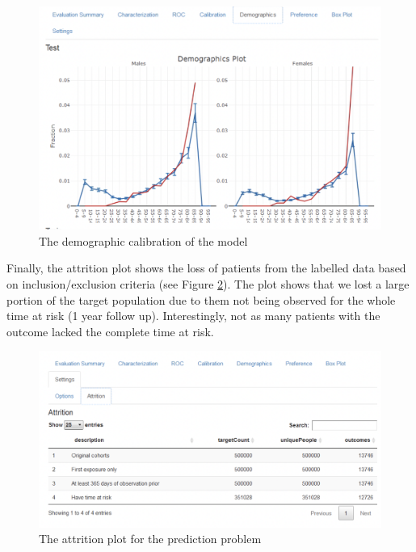 \documentclass[11pt]{book}
\theoremstyle{definition}
\theoremstyle{definition}
\theoremstyle{definition}
\theoremstyle{remark}
\begin{document}
\begin{figure}

{\centering \includegraphics[width=1\linewidth]{images/PatientLevelPrediction/shiny/singleShiny/singleShinyDemo} 

}

\caption{The demographic calibration of the model}\label{fig:shinyDemo}
\end{figure}

Finally, the attrition plot shows the loss of patients from the labelled
data based on inclusion/exclusion criteria (see Figure
\ref{fig:shinyAtt}). The plot shows that we lost a large portion of the
target population due to them not being observed for the whole time at
risk (1 year follow up). Interestingly, not as many patients with the
outcome lacked the complete time at risk.

\begin{figure}

{\centering \includegraphics[width=1\linewidth]{images/PatientLevelPrediction/shiny/singleShiny/singleShinyAtt} 

}

\caption{The attrition plot for the prediction problem}\label{fig:shinyAtt}
\end{figure}
\end{document}
